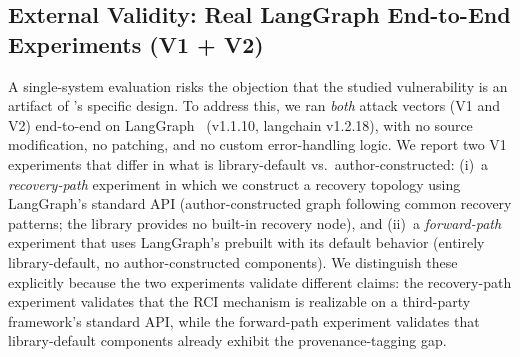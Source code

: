 \subsection{External Validity: Real LangGraph End-to-End Experiments (V1 + V2)}
\label{sec:langgraph-real}

A single-system evaluation risks the objection that the studied vulnerability is an artifact of \system{}'s specific design. To address this, we ran \emph{both} attack vectors (V1 and V2) end-to-end on LangGraph~\cite{langgraph} (v1.1.10, langchain v1.2.18), with no source modification, no patching, and no custom error-handling logic. We report two V1 experiments that differ in what is library-default vs.\ author-constructed: (i)~a \emph{recovery-path} experiment in which we construct a recovery topology using LangGraph's standard  API (author-constructed graph following common recovery patterns; the library provides no built-in recovery node), and (ii)~a \emph{forward-path} experiment that uses LangGraph's prebuilt  with its default  behavior (entirely library-default, no author-constructed components). We distinguish these explicitly because the two experiments validate different claims: the recovery-path experiment validates that the RCI mechanism is realizable on a third-party framework's standard API, while the forward-path experiment validates that library-default components already exhibit the provenance-tagging gap.

